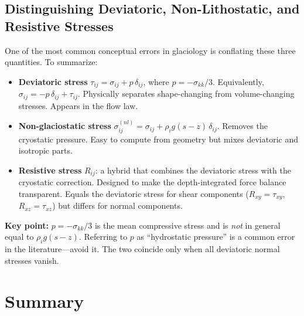\documentclass[11pt]{article}
\begin{document}
\subsection{Distinguishing Deviatoric, Non-Lithostatic, and Resistive Stresses}

One of the most common conceptual errors in glaciology is conflating these three quantities.  To summarize:

\begin{itemize}
  \item \textbf{Deviatoric stress} $\tau_{ij} = \sigma_{ij} + p\,\delta_{ij}$, where $p = -\sigma_{kk}/3$.  Equivalently, $\sigma_{ij} = -p\,\delta_{ij} + \tau_{ij}$.  Physically separates shape-changing from volume-changing stresses.  Appears in the flow law.

  \item \textbf{Non-glaciostatic stress} $\sigma_{ij}^{(nl)} = \sigma_{ij} + \rho_i g(s-z)\,\delta_{ij}$.  Removes the cryostatic pressure.  Easy to compute from geometry but mixes deviatoric and isotropic parts.

  \item \textbf{Resistive stress} $R_{ij}$: a hybrid that combines the deviatoric stress with the cryostatic correction.  Designed to make the depth-integrated force balance transparent.  Equals the deviatoric stress for shear components ($R_{xy} = \tau_{xy}$, $R_{xz} = \tau_{xz}$) but differs for normal components.
\end{itemize}

\medskip
\noindent\textbf{Key point:} $p = -\sigma_{kk}/3$ is the mean compressive stress and is \emph{not} in general equal to $\rho_i g(s-z)$.  Referring to $p$ as ``hydrostatic pressure'' is a common error in the literature---avoid it.  The two coincide only when all deviatoric normal stresses vanish.

\section{Summary}
\end{document}
